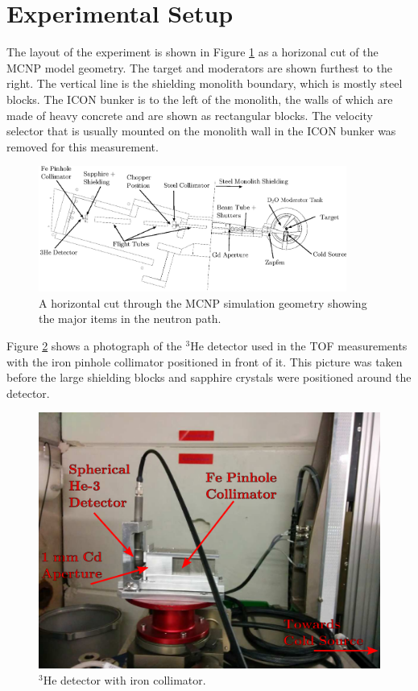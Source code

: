 \documentclass[5p,12pt]{elsarticle}
\begin{document}
%
%
%
%
%


\section{Experimental Setup}
\label{sec:setup}

The layout of the experiment is shown in Figure \ref{fig:geom} as a horizonal cut of the MCNP model geometry.  The target and moderators are shown furthest to the right.  The vertical line is the shielding monolith boundary, which is mostly steel blocks.  The ICON bunker is to the left of the monolith, the walls of which are made of heavy concrete and are shown as rectangular blocks.  The velocity selector that is usually mounted on the monolith wall in the ICON bunker was removed for this measurement.

\begin{figure}[ht!] 
  \centering
    \includegraphics[width=0.9\textwidth]{graphics/geom_bw_labels.eps}
     \caption{A horizontal cut through the MCNP simulation geometry showing the major items in the neutron path. \label{fig:geom} }
\end{figure}

Figure \ref{fig:det} shows a photograph of the $^3$He detector used in the TOF measurements with the iron pinhole collimator positioned in front of it.   This picture was taken before the large shielding blocks and sapphire crystals were positioned around the detector.

\begin{figure}[h!] 
  \centering
    \includegraphics[width=\columnwidth]{graphics/det.eps}
     \caption{$^3$He detector with iron collimator. \label{fig:det}}
\end{figure}
\end{document}
